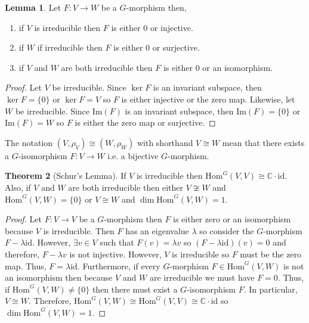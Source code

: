\documentclass[12pt]{extarticle}
\newcommand{\C}{\mathbb{C}}
\renewcommand{\Im}[1]{\mathrm{Im}(#1)}
\newcommand{\id}{\mathrm{id}}
\newcommand{\repHom}[3]{\mathrm{Hom}^{#1} \left( #2, #3 \right)}
\theoremstyle{definition}
\newtheorem{theorem}{Theorem}[section]
\newtheorem{lemma}[theorem]{Lemma}
\newenvironment{definition}[1][Definition:]{\begin{trivlist}
\item[\hskip \labelsep {\bfseries #1}]}{\end{trivlist}}
\begin{document}
\begin{definition}
\begin{lemma}
Let $F : V \to W$ be a $G$-morphism then,
\begin{enumerate}
\item if $V$ is irreducible then $F$ is either $0$ or injective.
\item if $W$ if irreducible then $F$ is either $0$ or surjective.
\item if $V$ and $W$ are both irreducible then $F$ is either $0$ or an isomorphism.
\end{enumerate}
\end{lemma}
\begin{proof}
Let $V$ be irreducible. Since $\ker{F}$ is an invariant subspace, then $\ker{F} = \{0\}$ or $\ker{F} = V$ so $F$ is either injective or the zero map. Likewise, let $W$ be irreducible. Since $\Im{F}$ is an invariant subspace, then $\Im{F} = \{0\}$ or $\Im{F} = W$ so $F$ is either the zero map or surjective.
\end{proof}
\end{definition}

\begin{definition}
The notation $(V, \rho_V) \cong (W, \rho_W)$ with shorthand $V \cong W$ mean that there exists a $G$-isomorphism $F : V \to W$ i.e. a bijective $G$-morphism.
\end{definition}

\begin{theorem}[Schur's Lemma]
If $V$ is irreducible then $\repHom{G}{V}{V} \cong \C \cdot \id$. Also, 
if $V$ and $W$ are both irreducible then either $V \not\cong W$ and $\repHom{G}{V}{W} = \{0\}$ or $V \cong W$ and $\dim{\repHom{G}{V}{W}} = 1$. 
\end{theorem}

\begin{proof}
Let $F : V \to V$ be a $G$-morphism then $F$ is either zero or an isomorphism because $V$ is irreducible. Then $F$ has an eigenvalue $\lambda$ so consider the $G$-morphism $F - \lambda \id$. However, $\exists v \in V$ such that $F(v) = \lambda v$ so $(F - \lambda \id)(v) = 0$ and therefore, $F - \lambda v$ is not injective. However, $V$ is irreducible so $F$ must be the zero map. Thus, $F = \lambda \id$. Furthermore, if every $G$-morphism $F \in \repHom{G}{V}{W}$ is not an isomorphism then because $V$ and $W$ are irreducible we must have $F = 0$. Thus, if $\repHom{G}{V}{W} \neq \{0\}$ then there must exist a $G$-isomorphism $F$. In particular, $V \cong W$. Therefore, $\repHom{G}{V}{W} \cong \repHom{G}{V}{V} \cong \C \cdot \id$ so $\dim{\repHom{G}{V}{W}} = 1$. 
\end{proof}
\end{document}
